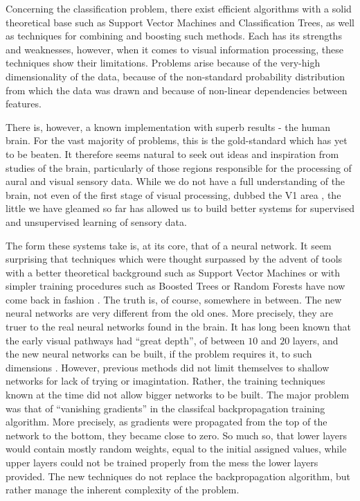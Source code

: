 \documentclass[12pt,a4paper,oneside,english]{UPBThesis}
\begin{document}
Concerning the classification problem, there exist efficient algorithms with a solid theoretical base such as Support Vector Machines and Classification Trees, as well as techniques for combining and boosting such methods. Each has its strengths and weaknesses, however,  when it comes to visual information processing, these techniques show their limitations. Problems arise because of the very-high dimensionality of the data, because of the non-standard probability distribution from which the data was drawn and because of non-linear dependencies between features.

There is, however, a known implementation with superb results - the human brain. For the vast majority of problems, this is the gold-standard which has yet to be beaten. It therefore seems natural to seek out ideas and inspiration from studies of the brain, particularly of those regions responsible for the processing of aural and visual sensory data. While we do not have a full understanding of the brain, not even of the first stage of visual processing, dubbed the V1 area \cite{understanding-V1,what-85percent-V1-doing}, the little we have gleamed so far has allowed us to build better systems for supervised \cite{gradient-based-learning,convolutional-networks-vision,best-practices-cnn,text-detection-character-recognition-unsupervised-feature-learning,multi-column-neural-networks,cnn-commitees-handwritten-character} and unsupervised learning \cite{high-level-features-unsupervised-feature-learning,tiny-images,reducing-dimensionality-neural-networks} of sensory data.

The form these systems take is, at its core, that of a neural network. It seem surprising that techniques which were thought surpassed by the advent of tools with a better theoretical background such as Support Vector Machines or with simpler training procedures such as Boosted Trees or Random Forests have now come back in fashion \cite{comparing-svm-cnn,mnist-website,best-architecture-object-recognition}. The truth is, of course, somewhere in between. The new neural networks are very different from the old ones. More precisely, they are truer to the real neural networks found in the brain. It has long been known that the early visual pathways had ``great depth'', of between $10$ and $20$ layers, and the new neural networks can be built, if the problem requires it, to such dimensions \cite{multi-column-neural-networks,gradient-based-learning}. However, previous methods did not limit themselves to shallow networks for lack of trying or imagintation. Rather, the training techniques known at the time did not allow bigger networks to be built. The major problem was that of ``vanishing gradients'' in the classifcal backpropagation training algorithm. More precisely, as gradients were propagated from the top of the network to the bottom, they became close to zero. So much so, that lower layers would contain mostly random weights, equal to the initial assigned values, while upper layers could not be trained properly from the mess the lower layers provided. The new techniques do not replace the backpropagation algorithm, but rather manage the inherent complexity of the problem.
\end{document}
